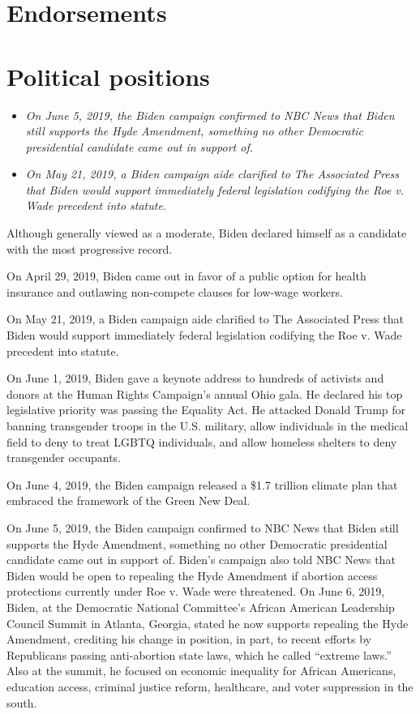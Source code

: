 \section{Endorsements}\label{endorsements}

\section{Political positions}\label{political-positions}

\begin{itemize}
\item
  \emph{On June 5, 2019, the Biden campaign confirmed to NBC News that
  Biden still supports the Hyde Amendment, something no other Democratic
  presidential candidate came out in support of.}
\item
  \emph{On May 21, 2019, a Biden campaign aide clarified to The
  Associated Press that Biden would support immediately federal
  legislation codifying the Roe v. Wade precedent into statute.}
\end{itemize}

Although generally viewed as a moderate, Biden declared himself as a
candidate with the most progressive record.

On April 29, 2019, Biden came out in favor of a public option for health
insurance and outlawing non-compete clauses for low-wage workers.

On May 21, 2019, a Biden campaign aide clarified to The Associated Press
that Biden would support immediately federal legislation codifying the
Roe v. Wade precedent into statute.

On June 1, 2019, Biden gave a keynote address to hundreds of activists
and donors at the Human Rights Campaign's annual Ohio gala. He declared
his top legislative priority was passing the Equality Act. He attacked
Donald Trump for banning transgender troops in the U.S. military, allow
individuals in the medical field to deny to treat LGBTQ individuals, and
allow homeless shelters to deny transgender occupants.

On June 4, 2019, the Biden campaign released a \$1.7 trillion climate
plan that embraced the framework of the Green New Deal.

On June 5, 2019, the Biden campaign confirmed to NBC News that Biden
still supports the Hyde Amendment, something no other Democratic
presidential candidate came out in support of. Biden's campaign also
told NBC News that Biden would be open to repealing the Hyde Amendment
if abortion access protections currently under Roe v. Wade were
threatened. On June 6, 2019, Biden, at the Democratic National
Committee's African American Leadership Council Summit in Atlanta,
Georgia, stated he now supports repealing the Hyde Amendment, crediting
his change in position, in part, to recent efforts by Republicans
passing anti-abortion state laws, which he called ``extreme laws.'' Also
at the summit, he focused on economic inequality for African Americans,
education access, criminal justice reform, healthcare, and voter
suppression in the south.

